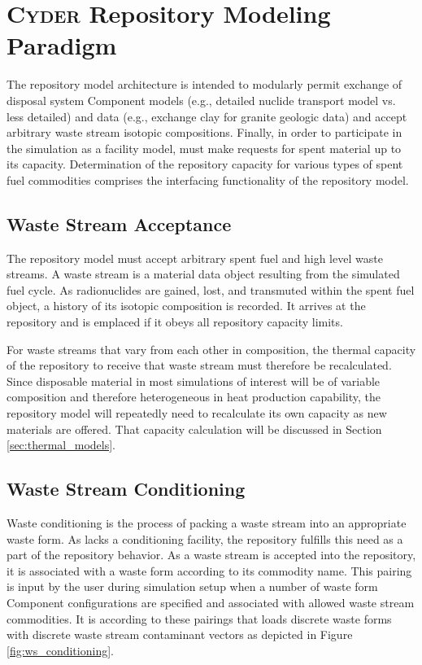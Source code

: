 \section{\textsc{Cyder} Repository Modeling Paradigm}

The \Cyder repository model architecture is intended to modularly permit 
exchange of disposal system Component models (e.g., detailed nuclide transport 
model vs. less detailed) and data (e.g., exchange clay for granite geologic 
data) and accept arbitrary waste stream isotopic compositions.  
Finally, in order to participate in the simulation as a facility model, \Cyder must 
make requests for spent material up to its capacity. Determination of the 
repository capacity for various types of spent fuel commodities comprises the 
interfacing functionality of the repository model.

\subsection{Waste Stream Acceptance}

The repository model must accept arbitrary spent fuel and high level waste 
streams. A waste stream is a material data object resulting from the \Cyclus 
simulated fuel cycle.  As radionuclides are gained, lost, and transmuted within 
the spent fuel object, a history of its isotopic composition is recorded.  It 
arrives at the repository and is emplaced if it obeys all repository capacity 
limits. 

For waste streams that vary from each other in composition, the thermal 
capacity of the repository to receive that waste stream must therefore be 
recalculated.  Since disposable material in most simulations of interest will 
be of variable composition and therefore heterogeneous in heat production 
capability, the repository model will repeatedly need to recalculate its own 
capacity as new materials are offered.  That capacity calculation will be 
discussed in Section \ref{sec:thermal_models}. 

\subsection{Waste Stream Conditioning}

Waste conditioning is the process of packing a waste stream into an appropriate 
waste form. As \Cyclus lacks a conditioning facility, the \Cyder repository 
fulfills this need as a part of the repository behavior. As a waste stream is 
accepted into the repository, it is associated with a waste form according 
to its commodity name. This pairing is input by the user during simulation 
setup when a number of waste form Component configurations are specified and 
associated with allowed waste stream commodities. It is according to these 
pairings that \Cyder loads discrete waste forms with discrete waste 
stream contaminant vectors as depicted in Figure \ref{fig:ws_conditioning}.

